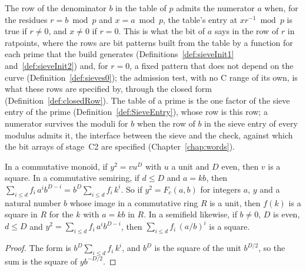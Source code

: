 \begin{definition}\label{def:admits}
  \leanok
  The row of the denominator $b$ in the table of $p$ admits the numerator $a$ when, for the residues
  $r = b \bmod p$ and $x = a \bmod p$, the table's entry at $x r^{-1} \bmod p$ is true if $r \ne 0$,
  and $x \ne 0$ if $r = 0$. This is what the bit of $a$ says in the row of $r$ in ratpoints, where
  the rows are bit patterns built from the table by a function for each prime that the build
  generates (Definitions~\ref{def:sieveInit1} and~\ref{def:sieveInit2}) and, for $r = 0$, a fixed
  pattern that does not depend on the curve (Definition~\ref{def:sieves0}); the admission test, with
  no C range of its own, is what these rows are specified by, through the closed form
  (Definition~\ref{def:closedRow}). The table of a prime is the one factor of the sieve
  entry of the prime (Definition~\ref{def:SieveEntry}), whose row is this row; a numerator survives
  the moduli for $b$ when the row of $b$ in the sieve entry of every modulus admits it, the
  interface between the sieve and the check, against which the bit arrays of stage~C2 are specified
  (Chapter~\ref{chap:words}).
\end{definition}

\begin{lemma}\label{lem:isSquare_div}
  \leanok
  In a commutative monoid, if $y^2 = v u^D$ with $u$ a unit and $D$ even, then $v$ is a square. In a
  commutative semiring, if $d \le D$ and $a = k b$, then
  $\sum_{i \le d} f_i\, a^i b^{D - i} = b^D \sum_{i \le d} f_i\, k^i$. So if $y^2 = F_c(a, b)$ for
  integers $a$, $y$ and a natural number $b$ whose image in a commutative ring $R$ is a unit, then
  $f(k)$ is a square in $R$ for the $k$ with $a = k b$ in $R$. In a semifield likewise, if
  $b \ne 0$, $D$ is even, $d \le D$ and $y^2 = \sum_{i \le d} f_i\, a^i b^{D - i}$, then
  $\sum_{i \le d} f_i\, (a/b)^i$ is a square.
\end{lemma}

\begin{proof}
  \leanok
  The form is $b^D \sum_{i \le d} f_i\, k^i$, and $b^D$ is the square of the unit $b^{D/2}$, so the
  sum is the square of $y b^{-D/2}$.
\end{proof}

